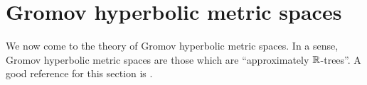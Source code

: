 %
%
%
%



\bigskip
\section{Gromov hyperbolic metric spaces}

We now come to the theory of Gromov hyperbolic metric spaces. In a sense, Gromov hyperbolic metric spaces are those which are ``approximately $\R$-trees''. A good reference for this section is \cite{Vaisala}.

